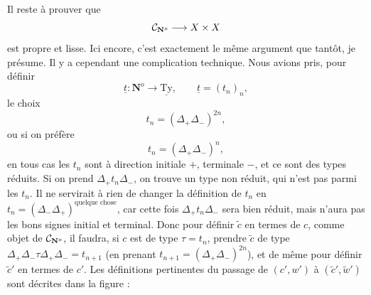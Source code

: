 Il reste à prouver que
\[ \mathcal{C}_{\mathbf{N}^o} \longrightarrow X \times X \]
est propre et lisse. Ici encore,
c'est exactement le même argument que tantôt, je présume. Il y a cependant une complication technique. Nous avions pris, pour définir
\[ \underline{t} : \mathbf{N}^o \longrightarrow \underline{\mathrm{Ty}}, \qquad \underline{t} = (t_n)_n, \]
le choix
\[ t_n = (\Delta_+\Delta_-)^{2n}, \]
ou si on préfère
\[ t_n = (\Delta_+\Delta_-)^n, \]
en tous cas les $t_n$ sont à direction initiale $+$, terminale $-$, et ce sont des types réduits. Si on prend $\Delta_+t_n\Delta_-$, on trouve un type non réduit, qui n'est pas parmi les $t_n$. Il ne servirait à rien de changer la définition de $t_n$ en $t_n = (\Delta_-\Delta_+)^{\text{quelque chose}}$, car cette fois $\Delta_+t_n\Delta_-$ sera bien réduit, mais n'aura pas les bons signes initial et terminal. Donc pour définir $\tilde{c}$ en termes de $c$, comme objet de $\mathcal{C}_{\mathbf{N}^o}$, il faudra, si $c$ est de type $\tau = t_n$, prendre $\tilde{c}$ de type $\Delta_+\Delta_-\tau\Delta_+\Delta_- = t_{n+1}$ (en prenant $t_{n+1} = (\Delta_+\Delta_-)^{2n}$), et de même pour définir $\tilde{c}'$ en termes de $c'$. Les définitions pertinentes du passage de $(c',w')$ à $(\tilde{c}',\tilde{w}')$ sont décrites dans la figure : %

